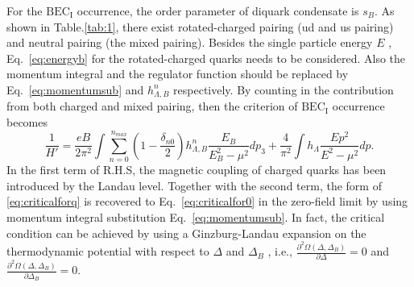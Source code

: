 \documentclass[prd, showpacs,nofootinbib,amsmath,amssymb,12pt]{revtex4}
\begin{document}
For the $\text{BEC}_\text{I}$ occurrence, the order parameter of diquark condensate  is $s_B$.
As shown in Table.\ref{tab:1}, there exist rotated-charged pairing (ud and us pairing) and neutral pairing (the mixed pairing).
Besides the single  particle energy $E$ , 
Eq.~\eqref{eq:energyb} for the rotated-charged quarks needs to be considered.
Also the momentum integral  and the regulator function should be replaced by Eq.~\eqref{eq:momentumsub} and $h_{\Lambda, B}^n$ respectively. By counting in the contribution from both charged and mixed pairing, then the  criterion of $\text{BEC}_\text{I}$ occurrence becomes
\begin{equation}
\label{eq:criticalforq}
\frac{1}{H'}  =
 \frac{eB}{2\pi^2} \int \sum_{n=0}^{n_{max}} (1 -\frac{\delta_{n0}}{2}) h_{\Lambda, B}^n
\frac{E_B}{E_B^2 -\mu^2 } dp_3 + \frac{4}{ \pi^2} \int  h_{\Lambda}
\frac{Ep^2 }{E^2 - \mu^2} dp.
\end{equation}
In the  first term of R.H.S, the magnetic coupling of 
charged quarks has been introduced by the Landau level. 
Together with the second term,
 the form of \cref{eq:criticalforq}  is recovered to Eq.~\eqref{eq:criticalfor0} in the zero-field limit by using momentum integral substitution Eq.~\eqref{eq:momentumsub}.
 In fact,   the critical condition can be achieved by using a Ginzburg-Landau
 expansion on the  thermodynamic potential with respect to $\Delta$ and 
$\Delta_B$ , i.e., $\frac{\partial^2\Omega(\Delta,\Delta_B)}{\partial \Delta} =0$  and $\frac{\partial^2\Omega(\Delta,\Delta_B)}{\partial \Delta_{B}} =0$.
\end{document}
